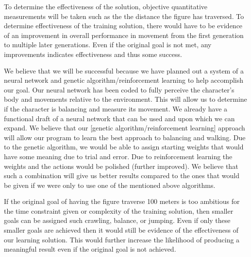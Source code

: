 \documentclass[letterpaper]{article} %
\begin{document}
To determine the effectiveness of the solution, objective quantitative measurements will be taken such as the the distance the figure has traversed. To determine effectiveness of the training solution, there would have to be evidence of an improvement in overall performance in movement from the first generation to multiple later generations. Even if the original goal is not met, any improvements indicates effectiveness and thus some success.

We believe that we will be successful because we have planned out a system of a neural network and genetic algorithm/reinforcement learning to help accomplish our goal. Our neural network has been coded to fully perceive the character's body and movements relative to the environment. This will allow us to determine if the character is balancing and measure its movement. We already have a functional draft of a neural network that can be used and upon which we can expand. We believe that our [genetic algorithm/reinforcement learning] approach will allow our program to learn the best approach to balancing and walking. Due to the genetic algorithm, we would be able to assign starting weights that would have some meaning due to trial and error. Due to reinforcement learning the weights and the actions would be polished (further improved). We believe that such a combination will give us better results compared to the ones that would be given if we were only to use one of the mentioned above algorithms.

If the original goal of having the figure traverse 100 meters is too ambitious for the time constraint given or complexity of the training solution, then smaller goals can be assigned such crawling, balance, or jumping. Even if only these smaller goals are achieved then it would still be evidence of the effectiveness of our learning solution. This would further increase the likelihood of producing a meaningful result even if the original goal is not achieved.
\end{document}
